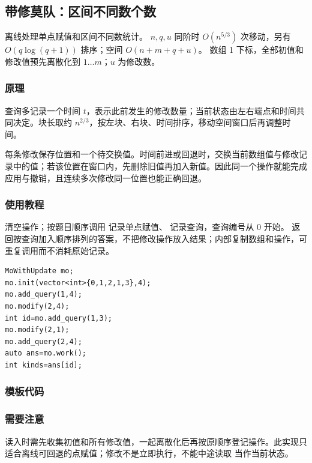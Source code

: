 \subsection{带修莫队：区间不同数个数}
\label{ds:mo-update}
\AlgorithmInfo
    {离线处理单点赋值和区间不同数统计。}
    {$n,q,u$ 同阶时 $O(n^{5/3})$ 次移动，另有 $O(q\log(q+1))$ 排序；空间 $O(n+m+q+u)$。}
    {数组 1 下标，全部初值和修改值预先离散化到 $1\ldots m$；$u$ 为修改数。}
\subsubsection*{原理}
查询多记录一个时间 $t$，表示此前发生的修改数量；当前状态由左右端点和时间共同决定。块长取约 $n^{2/3}$，按左块、右块、时间排序，移动空间窗口后再调整时间。

每条修改保存位置和一个待交换值。时间前进或回退时，交换当前数组值与修改记录中的值；若该位置在窗口内，先删除旧值再加入新值。因此同一个操作就能完成应用与撤销，且连续多次修改同一位置也能正确回退。

\subsubsection*{使用教程}
 清空操作；按题目顺序调用  记录单点赋值、 记录查询，查询编号从 0 开始。 返回按查询加入顺序排列的答案，不把修改操作放入结果；内部复制数组和操作，可重复调用而不消耗原始记录。
\begin{lstlisting}[style=mtycpp,numbers=none]
MoWithUpdate mo;
mo.init(vector<int>{0,1,2,1,3},4);
mo.add_query(1,4);
mo.modify(2,4);
int id=mo.add_query(1,3);
mo.modify(2,1);
mo.add_query(2,4);
auto ans=mo.work();
int kinds=ans[id];
\end{lstlisting}
\subsubsection*{模板代码}
\subsubsection*{需要注意}
读入时需先收集初值和所有修改值，一起离散化后再按原顺序登记操作。此实现只适合离线可回退的点赋值；修改不是立即执行，不能中途读取  当作当前状态。
